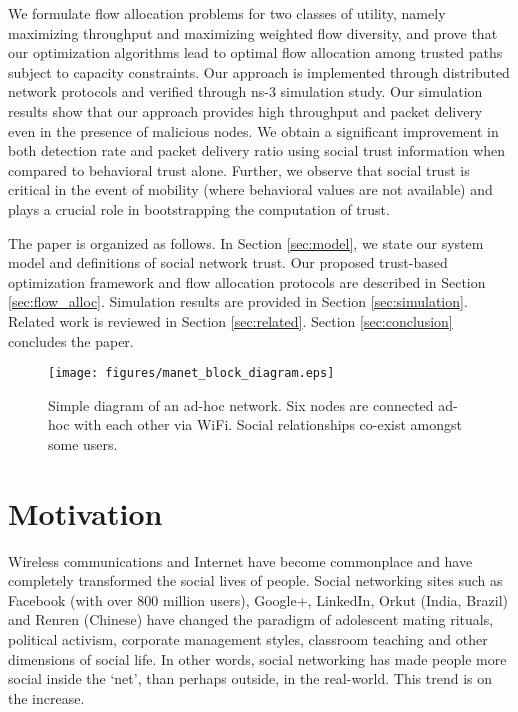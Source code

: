 \documentclass[conference]{IEEEtran}
\begin{document}
	We formulate flow allocation problems for two classes of utility, namely maximizing throughput and maximizing weighted flow diversity, and prove that our optimization algorithms lead to optimal flow allocation among trusted paths subject to capacity constraints.  Our approach is implemented through distributed network protocols and verified through ns-3 simulation study.  Our simulation results show that our approach provides high throughput and packet delivery even in the presence of malicious nodes. We obtain a significant improvement in both detection rate and packet delivery ratio using social trust information when compared to behavioral trust alone. Further, we observe that social trust is critical in the event of mobility (where behavioral values are not available) and plays a crucial role in bootstrapping the computation of trust.


The paper is organized as follows.   In Section \ref{sec:model}, we state our system model and definitions of social network trust.    Our proposed trust-based optimization framework and flow allocation protocols are described in Section \ref{sec:flow_alloc}.  Simulation results are provided in Section \ref{sec:simulation}.  Related work is reviewed in Section \ref{sec:related}.  Section \ref{sec:conclusion} concludes the paper.
 \begin{figure}[t]
	\centering
		\texttt{[image: figures/manet\_block\_diagram.eps]}
	\caption{Simple diagram of an ad-hoc network. Six nodes are connected ad-hoc with each other via WiFi. Social relationships co-exist amongst some users.}
	\label{fig:manet_block_diagram}
\end{figure}

\section{Motivation}
\label{sec:motivation}

Wireless communications  and Internet have become commonplace and have completely transformed the social lives of people. Social networking sites such as Facebook (with over 800 million users), Google+, LinkedIn, Orkut (India, Brazil) and Renren (Chinese) have changed the paradigm of adolescent mating rituals, political activism, corporate management styles, classroom teaching and other dimensions of social life. In other words, social networking has made people more social inside the `net', than perhaps outside, in the real-world. This trend is on the increase.
\end{document}
